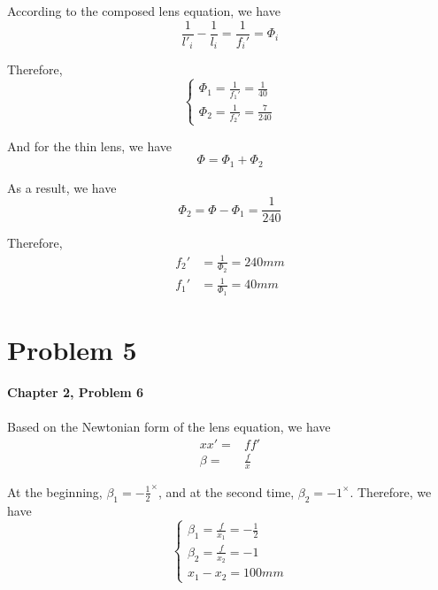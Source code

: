 \documentclass{article}
\begin{document}
According to the composed lens equation, we have
\begin{equation}
    \frac{1}{l'_i}-\frac{1}{l_i} = \frac{1}{f_i'} = \mathit{\Phi_i}
\end{equation}

Therefore,
\begin{equation}
    \begin{cases}
        \mathit{\Phi_1} = \frac{1}{f_1'} = \frac{1}{40} \\
        \mathit{\Phi_2} = \frac{1}{f_2'} = \frac{7}{240}
    \end{cases}
\end{equation}

And for the thin lens, we have
\begin{equation}
    \mathit{\Phi} = \mathit{\Phi_1}+\mathit{\Phi_2}
\end{equation}

As a result, we have
\begin{equation}
    \mathit{\Phi_2} = \mathit{\Phi} - \mathit{\Phi_1} = \frac{1}{240}
\end{equation}

Therefore,
\begin{equation}
    \boxed{
        \begin{aligned}
            f_2' & = \frac{1}{\mathit{\Phi_2}} = 240mm \\
            f_1' & = \frac{1}{\mathit{\Phi_1}} = 40mm
        \end{aligned}
    }
\end{equation}

\section{Problem 5}
\textbf{Chapter 2, Problem 6}\\\\

Based on the Newtonian form of the lens equation, we have
\begin{align}
    xx' =   & ff'         \\
    \beta = & \frac{f}{x}
\end{align}

At the beginning, $\beta_1 = -\frac{1}{2}^{\times}$, and at the second time, $\beta_2 = -1^{\times}$. Therefore, we have
\begin{equation}
    \begin{cases}
        \beta_1 = \frac{f}{x_1} = -\frac{1}{2} \\
        \beta_2 = \frac{f}{x_2} = -1           \\
        x_1 -x_2= 100mm
    \end{cases}
\end{equation}
\end{document}
